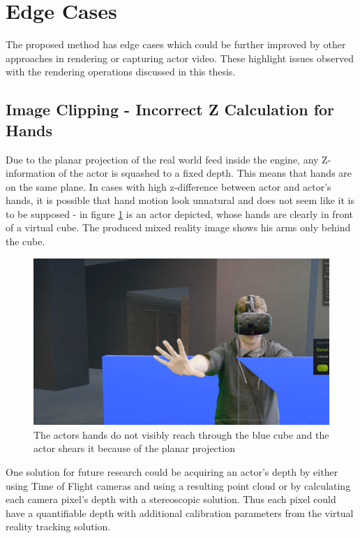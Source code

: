 \section{Edge Cases}

The proposed method has edge cases which could be further improved by other 
approaches in rendering or capturing actor video. These highlight issues 
observed with the rendering operations discussed in this thesis.

\subsection{Image Clipping - Incorrect Z Calculation for Hands}

Due to the planar projection of the real world feed inside the engine, any 
Z-information of the actor is squashed to a fixed depth. This means that hands 
are on the same plane. In cases with high z-difference between actor and 
actor's hands, it is possible that hand motion look unnatural and does not seem 
like it is to be supposed - in figure \ref{fig:edge:z-clipping} is an actor 
depicted, whose hands are clearly in front of a virtual cube. The produced 
mixed reality image shows his arms only behind the cube.

\begin{figure}[htb]
	\centering
	\includegraphics[width=\textwidth]{gfx/issues/z-clipping.png}
	\caption{The actors hands do not visibly reach through the blue cube and 
	the actor shears it because of the planar projection}
	\label{fig:edge:z-clipping}
\end{figure}

One solution for future research could be acquiring an actor's depth by either 
using Time of Flight cameras and using a resulting point cloud or by 
calculating each camera pixel's depth with a stereoscopic solution. Thus each 
pixel could have a quantifiable depth with additional calibration parameters 
from the virtual reality tracking solution.

